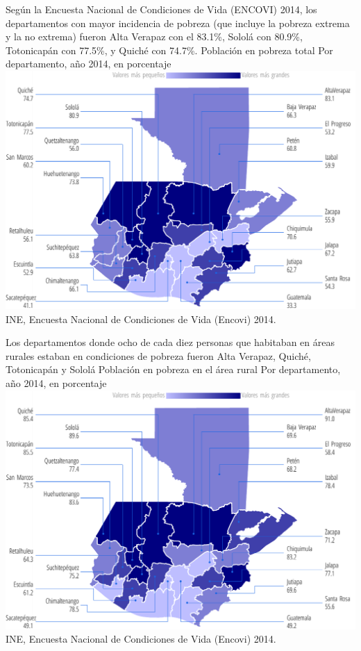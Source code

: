%
{%
	Según la Encuesta Nacional de Condiciones de Vida (ENCOVI) 2014, los departamentos con mayor incidencia de pobreza (que incluye la pobreza extrema y la no extrema) fueron Alta Verapaz con el 83.1\%, Sololá con 80.9\%, Totonicapán con 77.5\%, y Quiché con 74.7\%. }%
{%
	Población en pobreza total
} %
{%
	Por departamento, año 2014, en porcentaje} %
{%
	\includegraphics[width=52\cuadri]{graficas/1_19.pdf}}%
{%
	INE, Encuesta Nacional de Condiciones de Vida (Encovi) 2014.} %


%
{%
	Los departamentos donde ocho de cada diez personas que habitaban en áreas rurales estaban en condiciones de pobreza fueron Alta Verapaz, Quiché, Totonicapán y Sololá}%
{%
	Población en pobreza en el área rural
} %
{%
	Por departamento, año 2014, en porcentaje} %
{%
	\includegraphics[width=52\cuadri]{graficas/1_17.pdf}}%
{%
	INE, Encuesta Nacional de Condiciones de Vida (Encovi) 2014.} %

